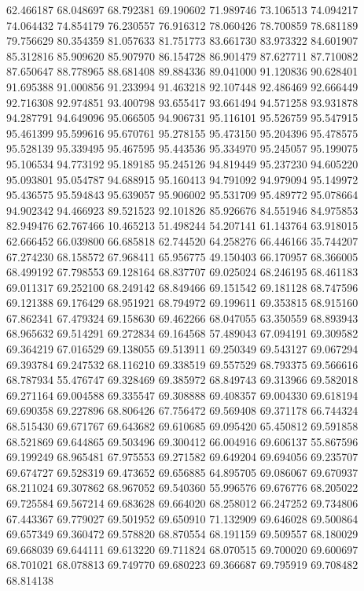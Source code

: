 62.466187
68.048697
68.792381
69.190602
71.989746
73.106513
74.094217
74.064432
74.854179
76.230557
76.916312
78.060426
78.700859
78.681189
79.756629
80.354359
81.057633
81.751773
83.661730
83.973322
84.601907
85.312816
85.909620
85.907970
86.154728
86.901479
87.627711
87.710082
87.650647
88.778965
88.681408
89.884336
89.041000
91.120836
90.628401
91.695388
91.000856
91.233994
91.463218
92.107448
92.486469
92.666449
92.716308
92.974851
93.400798
93.655417
93.661494
94.571258
93.931878
94.287791
94.649096
95.066505
94.906731
95.116101
95.526759
95.547915
95.461399
95.599616
95.670761
95.278155
95.473150
95.204396
95.478575
95.528139
95.339495
95.467595
95.443536
95.334970
95.245057
95.199075
95.106534
94.773192
95.189185
95.245126
94.819449
95.237230
94.605220
95.093801
95.054787
94.688915
95.160413
94.791092
94.979094
95.149972
95.436575
95.594843
95.639057
95.906002
95.531709
95.489772
95.078664
94.902342
94.466923
89.521523
92.101826
85.926676
84.551946
84.975853
82.949476
62.767466
10.465213
51.498244
54.207141
61.143764
63.918015
62.666452
66.039800
66.685818
62.744520
64.258276
66.446166
35.744207
67.274230
68.158572
67.968411
65.956775
49.150403
66.170957
68.366005
68.499192
67.798553
69.128164
68.837707
69.025024
68.246195
68.461183
69.011317
69.252100
68.249142
68.849466
69.151542
69.181128
68.747596
69.121388
69.176429
68.951921
68.794972
69.199611
69.353815
68.915160
67.862341
67.479324
69.158630
69.462266
68.047055
63.350559
68.893943
68.965632
69.514291
69.272834
69.164568
57.489043
67.094191
69.309582
69.364219
67.016529
69.138055
69.513911
69.250349
69.543127
69.067294
69.393784
69.247532
68.116210
69.338519
69.557529
68.793375
69.566616
68.787934
55.476747
69.328469
69.385972
68.849743
69.313966
69.582018
69.271164
69.004588
69.335547
69.308888
69.408357
69.004330
69.618194
69.690358
69.227896
68.806426
67.756472
69.569408
69.371178
66.744324
68.515430
69.671767
69.643682
69.610685
69.095420
65.450812
69.591858
68.521869
69.644865
69.503496
69.300412
66.004916
69.606137
55.867596
69.199249
68.965481
67.975553
69.271582
69.649204
69.694056
69.235707
69.674727
69.528319
69.473652
69.656885
64.895705
69.086067
69.670937
68.211024
69.307862
68.967052
69.540360
55.996576
69.676776
68.205022
69.725584
69.567214
69.683628
69.664020
68.258012
66.247252
69.734806
67.443367
69.779027
69.501952
69.650910
71.132909
69.646028
69.500864
69.657349
69.360472
69.578820
68.870554
68.191159
69.509557
68.180029
69.668039
69.644111
69.613220
69.711824
68.070515
69.700020
69.600697
68.701021
68.078813
69.749770
69.680223
69.366687
69.795919
69.708482
68.814138

